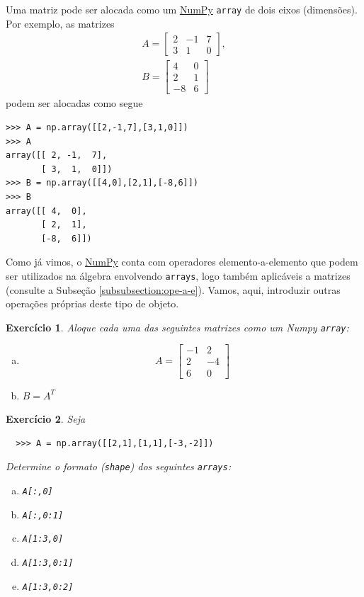 \documentclass[12pt]{article}
\newtheorem{exr}{Exercício}[section]
\begin{document}
Uma matriz pode ser alocada como um \href{https://numpy.org/}{NumPy} \lstinline+array+ de dois eixos (dimensões). Por exemplo, as matrizes
\begin{gather}
  A =
  \begin{bmatrix}
    2 & -1 & 7\\
    3 & 1 & 0
  \end{bmatrix},\\
  B =
  \begin{bmatrix}
    4 & 0\\
    2 & 1\\
   -8 & 6
  \end{bmatrix}
\end{gather}
podem ser alocadas como segue
\begin{lstlisting}
>>> A = np.array([[2,-1,7],[3,1,0]])
>>> A
array([[ 2, -1,  7],
       [ 3,  1,  0]])
>>> B = np.array([[4,0],[2,1],[-8,6]])
>>> B
array([[ 4,  0],
       [ 2,  1],
       [-8,  6]])
\end{lstlisting}


Como já vimos, o \href{https://numpy.org/}{NumPy} conta com operadores elemento-a-elemento que podem ser utilizados na álgebra envolvendo \lstinline+arrays+, logo também aplicáveis a matrizes (consulte a Subseção \ref{subsubsection:ope-a-e}). Vamos, aqui, introduzir outras operações próprias deste tipo de objeto.

\begin{exr}
  Aloque cada uma das seguintes matrizes como um Numpy \lstinline+array+:
  \begin{enumerate}[a)]
  \item
    \begin{equation}
      A =
      \begin{bmatrix}
        -1 & 2\\
        2 & -4\\
        6 & 0
      \end{bmatrix}
    \end{equation}
  \item $B = A^T$ 
  \end{enumerate}
\end{exr}

\begin{exr}
  Seja
  \begin{lstlisting}
  >>> A = np.array([[2,1],[1,1],[-3,-2]])
  \end{lstlisting}
  Determine o formato (\lstinline+shape+) dos seguintes \lstinline+arrays+:
  \begin{enumerate}[a)]
  \item \lstinline+A[:,0]+
  \item \lstinline+A[:,0:1]+
  \item \lstinline+A[1:3,0]+
  \item \lstinline+A[1:3,0:1]+
  \item \lstinline+A[1:3,0:2]+
  \end{enumerate}
\end{exr}
\end{document}
